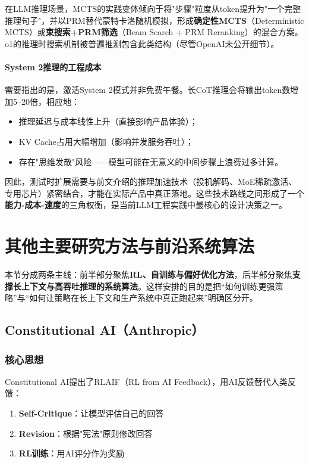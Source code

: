 \documentclass[12pt,a4paper]{article}
\begin{document}
在LLM推理场景，MCTS的实践变体倾向于将"步骤"粒度从token提升为"一个完整推理句子"，并以PRM替代蒙特卡洛随机模拟，形成\textbf{确定性MCTS}（Deterministic MCTS）或\textbf{束搜索+PRM筛选}（Beam Search + PRM Reranking）的混合方案。o1的推理时搜索机制被普遍推测包含此类结构（尽管OpenAI未公开细节）。

\paragraph{System 2推理的工程成本}

需要指出的是，激活System 2模式并非免费午餐。长CoT推理会将输出token数增加5--20倍，相应地：
\begin{itemize}
    \item 推理延迟与成本线性上升（直接影响产品体验）；
    \item KV Cache占用大幅增加（影响并发服务吞吐）；
    \item 存在"思维发散"风险——模型可能在无意义的中间步骤上浪费过多计算。
\end{itemize}

因此，测试时扩展需要与前文介绍的推理加速技术（投机解码、MoE稀疏激活、专用芯片）紧密结合，才能在实际产品中真正落地。这些技术路线之间形成了一个\textbf{能力-成本-速度}的三角权衡，是当前LLM工程实践中最核心的设计决策之一。

\section{其他主要研究方法与前沿系统算法}

本节分成两条主线：前半部分聚焦\textbf{RL、自训练与偏好优化方法}，后半部分聚焦\textbf{支撑长上下文与高吞吐推理的系统算法}。这样安排的目的是把“如何训练更强策略”与“如何让策略在长上下文和生产系统中真正跑起来”明确区分开。

\subsection{Constitutional AI（Anthropic）}

\subsubsection{核心思想}

Constitutional AI提出了RLAIF（RL from AI Feedback），用AI反馈替代人类反馈：

\begin{enumerate}
    \item \textbf{Self-Critique}：让模型评估自己的回答
    \item \textbf{Revision}：根据"宪法"原则修改回答
    \item \textbf{RL训练}：用AI评分作为奖励
\end{enumerate}
\end{document}
